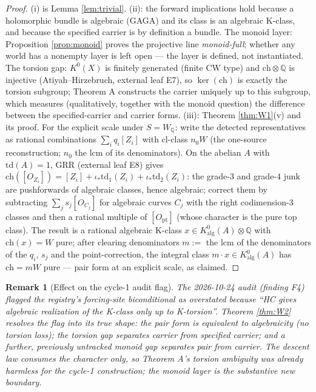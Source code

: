 \documentclass[11pt]{article}
\newtheorem{remark}{Remark}
\begin{document}
\begin{proof}
(i) is Lemma \ref{lem:trivial}. (ii): the forward implications hold because a holomorphic bundle is algebraic
(GAGA) and its class is an algebraic K-class, and because the specified carrier is by definition a bundle. The
monoid layer: Proposition \ref{prop:monoid} proves the projective line \emph{monoid-full}; whether any world has a
nonempty layer is left open --- the layer is defined, not instantiated. The torsion gap:
$K^0(X)$ is finitely generated (finite CW type) and $\mathrm{ch}\otimes\mathbb{Q}$ is injective (Atiyah--Hirzebruch,
external leaf E7), so $\ker(\mathrm{ch})$ is exactly the torsion subgroup; Theorem A constructs the carrier
uniquely up to this subgroup, which measures (qualitatively, together with the monoid question) the difference
between the specified-carrier and carrier forms. (iii): Theorem \ref{thm:W1}(v) and its proof. For the explicit
scale under $S=W_\mathbb{Q}$: write the detected representatives as rational combinations $\sum_i q_i[Z_i]$ with
$\mathrm{cl}$-class $n_0W$ (the one-source reconstruction; $n_0$ the lcm of its denominators). On the abelian $A$
with $\mathrm{td}(A)=1$, GRR (external leaf E8) gives $\mathrm{ch}([O_{Z_i}])=[Z_i]+\iota_*\mathrm{td}_1(Z_i)+\iota_*\mathrm{td}_2(Z_i)$:
the grade-$3$ and grade-$4$ junk are pushforwards of algebraic classes, hence algebraic; correct them by
subtracting $\sum_j s_j[O_{C_j}]$ for algebraic curves $C_j$ with the right codimension-$3$ classes and then a
rational multiple of $[O_{\mathrm{pt}}]$ (whose character is the pure top class). The result is a rational algebraic K-class $x\in K^0_{\mathrm{alg}}(A)\otimes\mathbb{Q}$ with $\mathrm{ch}(x)=W$ pure;
after clearing denominators $m:=$ the lcm of the denominators of the $q_i$, $s_j$ and the point-correction, the
integral class $m\cdot x\in K^0_{\mathrm{alg}}(A)$ has $\mathrm{ch}=mW$ pure --- pair form at an explicit scale, as claimed.
\end{proof}

\begin{remark}[Effect on the cycle-1 audit flag]
The 2026-10-24 audit (finding F4) flagged the registry's forcing-site biconditional as overstated because
``HC gives algebraic realization of the K-class only up to K-torsion''. Theorem \ref{thm:W2} resolves the flag
into its true shape: the pair form is equivalent to algebraicity (no torsion loss); the torsion gap separates
carrier from specified carrier; and a further, previously untracked monoid gap separates pair from carrier. The
descent law consumes the \emph{character} only, so Theorem A's torsion ambiguity was already harmless for the
cycle-1 construction; the monoid layer is the substantive new boundary.
\end{remark}
\end{document}

